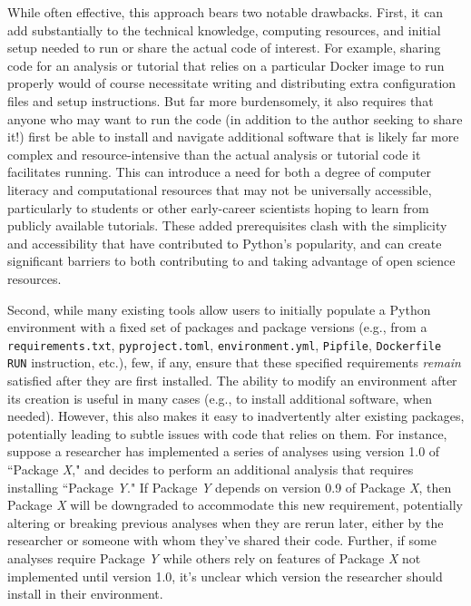 \documentclass[preprint,12pt, a4paper]{elsarticle}
\begin{document}
While often effective, this approach bears two notable drawbacks.
First, it can add substantially to the technical knowledge, computing resources, and initial setup needed to run or share the actual code of interest.
For example, sharing code for an analysis or tutorial that relies on a particular Docker image to run properly would of course necessitate writing and distributing extra configuration files and setup instructions.
But far more burdensomely, it also requires that anyone who may want to run the code (in addition to the author seeking to share it!) first be able to install and navigate additional software that is likely far more complex and resource-intensive than the actual analysis or tutorial code it facilitates running.
This can introduce a need for both a degree of computer literacy and computational resources that may not be universally accessible, particularly to students or other early-career scientists hoping to learn from publicly available tutorials.
These added prerequisites clash with the simplicity and accessibility that have contributed to Python's popularity, and can create significant barriers to both contributing to and taking advantage of open science resources.

Second, while many existing tools allow users to initially populate a Python environment with a fixed set of packages and package versions (e.g., from a \texttt{requirements.txt}, \texttt{pyproject.toml}, \texttt{environment.yml}, \texttt{Pipfile}, \texttt{Dockerfile RUN} instruction, etc.), few, if any, ensure that these specified requirements \textit{remain} satisfied after they are first installed.
The ability to modify an environment after its creation is useful in many cases (e.g., to install additional software, when needed). However, this also makes it easy to inadvertently alter existing packages, potentially leading to subtle issues with code that relies on them.
For instance, suppose a researcher has implemented a series of analyses using version 1.0 of ``Package \textit{X}," and decides to  perform an additional analysis that requires installing ``Package \textit{Y}."
If Package \textit{Y} depends on version 0.9 of Package \textit{X}, then Package \textit{X} will be downgraded to accommodate this new requirement, potentially altering or breaking previous analyses when they are rerun later, either by the researcher or someone with whom they've shared their code.
Further, if some analyses require Package \textit{Y} while others rely on features of Package \textit{X} not implemented until version 1.0, it's unclear which version the researcher should install in their environment.
\end{document}
